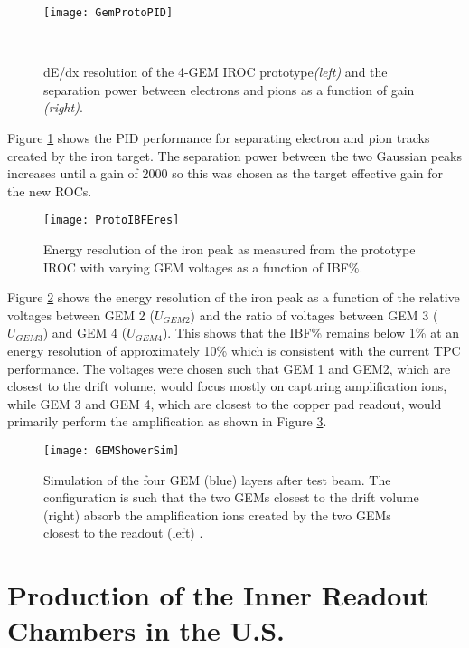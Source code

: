 \begin{figure}[h]
\texttt{[image: GemProtoPID]}
\centering
\caption{dE/dx resolution of the 4-GEM IROC prototype\textit{(left)} and the separation power between electrons and pions as a function of gain \textit{(right)}\cite{CERN-LHCC-2015-002}.}\

\label{fig:GemProtoPID}
\end{figure}

Figure \ref{fig:GemProtoPID} shows the PID performance for separating electron and pion tracks created by the iron target.  The separation power between the two Gaussian peaks increases until a gain of 2000 so this was chosen as the target effective gain for the new ROCs.



\begin{figure}[h]
\texttt{[image: ProtoIBFEres]}
\centering
\caption{Energy resolution of the iron peak as measured from the prototype IROC with varying GEM voltages as a function of IBF\%\cite{CERN-LHCC-2015-002}.}
\label{fig:ProtoIBFEres}
\end{figure}


Figure \ref{fig:ProtoIBFEres} shows the energy resolution of the iron peak as a function of the relative voltages between GEM 2 ($U_{GEM2}$) and the ratio of voltages between GEM 3 ($U_{GEM3}$) and GEM 4 ($U_{GEM4}$).  This shows that the IBF\% remains below 1\% at an energy resolution of approximately 10\% which is consistent with the current TPC performance.  The voltages were chosen such that GEM 1 and GEM2, which are closest to the drift volume, would focus mostly on capturing amplification ions, while GEM 3 and GEM 4, which are closest to the copper pad readout, would primarily perform the amplification as shown in Figure \ref{fig:showersim}.

\begin{figure}[h]
\texttt{[image: GEMShowerSim]}
\centering
\caption{Simulation of the four GEM (blue) layers after test beam.  The configuration is such that the two GEMs closest to the drift volume (right) absorb the amplification ions created by the two GEMs closest to the readout (left) \cite{CERN-LHCC-2015-002}.}
\label{fig:showersim}
\end{figure}

\section{Production of the Inner Readout Chambers in the U.S.}

